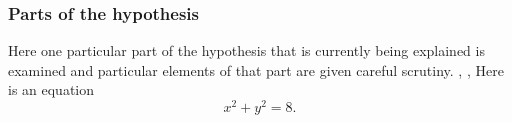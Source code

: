 \subsubsection{Parts of the hypothesis}

Here one particular part of the hypothesis that is 
currently being explained is examined and particular
elements of that part are given careful scrutiny. \autocite{chenGraphHomotopyGraham2001}, \autocite{chenGraphHomotopyGraham2001},\autocite{virkContractibilityRipsComplexes2024}
Here is an equation \[x^2 + y^2 = 8.\]





\printbibliography[heading=subbibnumbered]


% 
%     
